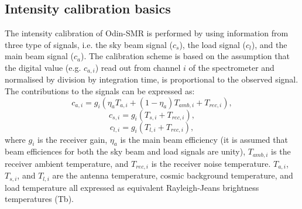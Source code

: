 \documentclass[12pt]{article}
\begin{document}
\subsection{Intensity calibration basics}
\label{sec:intensity_basic}
The intensity calibration of Odin-SMR is performed by using
information from three type of signals, i.e. the sky beam signal
(\(c_{s}\)),
the load signal (\(c_{l}\)), and the main beam signal (\(c_{a}\)).
The calibration scheme is based on the assumption that the 
digital value (e.g. \(c_{a,i}\)) read out from channel \(i\) of the 
spectrometer and 
normalised by division by integration time, is proportional to the
observed signal. The contributions to the signals 
can be expressed as:
\begin{equation}
c_{a,i}=g_{i}\left(\eta_{a} T_{a,i}+(1-\eta_{a})T_{amb,i}+T_{rec,i}\right),
\end{equation}
\begin{equation}
\label{eq:skybeam}
c_{s,i}=g_{i}\left(T_{s,i}+T_{rec,i}\right),
\end{equation}
\begin{equation}
c_{l,i}=g_{i}\left(T_{l,i}+T_{rec,i}\right),
\end{equation}
where \(g_{i}\) is the receiver gain, \(\eta_{a}\) is the main beam
efficiency (it is assumed that beam efficiences for 
both the sky beam and load signals are unity), 
\(T_{amb,i}\) is the receiver ambient temperature,
and \(T_{rec,i}\) is the receiver noise temperature.
\(T_{a,i}\), \(T_{s,i}\), and \(T_{l,i}\) are the antenna temperature,
cosmic background temperature, and load temperature all expressed
as equivalent Rayleigh-Jeans brightness temperatures (Tb).
\end{document}
